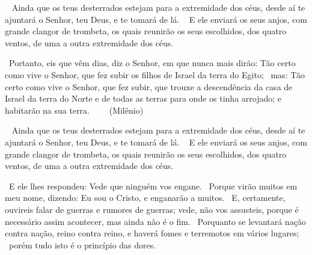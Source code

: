 \documentclass[12pt,aspectratio=169]{beamer}
\newcommand{\ver}[1]{%
    \raisebox{0.50ex}{%
        \scalebox{1.1}{%
            \pmb{\textbf{\textcolor{BSpbg}{#1}}}%
        }%
    }%
}
\newcommand{\QUOTE}[1]{%
    \par\noindent\hspace*{0.1\linewidth}%
    \begin{minipage}{0.8\linewidth}%
        \linespread{1.35}\large{#1}%
    \end{minipage}%
}
\newcommand{\WIDEQUOTE}[1]{%
    \par\noindent\hspace*{0.02\linewidth}%
    \begin{minipage}{0.92\linewidth}%
        \linespread{1.25}\large{#1}%
    \end{minipage}%
}
\newcommand{\RED}[1]{{\textcolor{TXred}{#1}}}
\newcommand{\ORA}[1]{{\textcolor{TXora}{#1}}}
\newcommand{\YEL}[1]{{\textcolor{TXyel}{#1}}}
\newcommand{\GRE}[1]{{\textcolor{TXgre}{#1}}}
\newcommand{\CYA}[1]{{\textcolor{TXcya}{#1}}}
\newcommand{\BLU}[1]{{\textcolor{TXblu}{#1}}}
\newcommand{\MAG}[1]{{\textcolor{TXmag}{#1}}}
\newcommand{\BRI}[1]{{\textcolor{BSpbg}{#1}}}   %
\begin{document}
    \begin{frame}
        \QUOTE{%
            \ver{(ARA) Dt~30.4}~%
            Ainda  que  os   teus   \BLU{des}\BRI{ter}\BLU{ra}\BRI{dos}   estejam   para   a
            \GRE{extremidade dos céus}, desde aí te \ORA{ajuntará} o Senhor, teu Deus, e  te
            tomará de lá.
            \ver{(ARA) Mt~24.31}~%
            E ele enviará os seus \YEL{anjos}, com grande  clangor  de  trombeta,  os  quais
            \ORA{reunirão} os seus \BLU{es}\BRI{co}\BLU{lhi}\BRI{dos},  dos  quatro  ventos,
            de uma a outra \GRE{extremidade dos céus}.
        }
    \end{frame}

    \begin{frame}
        \QUOTE{%
            \ver{(ARA) Jr~23.7}~Portanto, eis que vêm dias, diz o Senhor, em que nunca  mais
            dirão: Tão certo como vive o Senhor, que fez \YEL{subir os filhos de  Israel  da
            terra do Egito}; \ver{8}~mas: Tão certo como vive o Senhor, que fez  subir,  que
            \MAG{trouxe a descendência da casa de Israel da terra do Norte  e  de  todas  as
            terras  para  onde  os  tinha  arrojado};  \GRE{e  habitarão  na   sua   terra}.
            $\qquad$(\GRE{Milênio})
        }
    \end{frame}

    \begin{frame}
        \QUOTE{%
            \ver{(ARA) Dt~30.4}~%
            Ainda  que  os   teus   \BLU{des}\BRI{ter}\BLU{ra}\BRI{dos}   estejam   para   a
            \GRE{extremidade dos céus}, desde aí te \ORA{ajuntará} o Senhor, teu Deus, e  te
            tomará de lá.
            \ver{(ARA) Mt~24.31}~%
            E ele enviará os seus \YEL{anjos}, com grande  clangor  de  trombeta,  os  quais
            \ORA{reunirão} os seus \BLU{es}\BRI{co}\BLU{lhi}\BRI{dos},  dos  quatro  ventos,
            de uma a outra \GRE{extremidade dos céus}.
        }
    \end{frame}

    \begin{frame}
        \WIDEQUOTE{%
            \ver{(ARA) Mt~24.4}~E ele lhes respondeu: Vede  que  ninguém  vos  \RED{engane}.
            \ver{5}~Porque  virão  muitos  em  meu  nome,  dizendo:  Eu  sou  o  Cristo,   e
            \RED{enganarão} a muitos. \ver{6}~E, certamente, ouvireis falar de \ORA{guerras}
            e \ORA{rumores de guerras}; vede, não vos assusteis, porque é  necessário  assim
            acontecer, mas ainda não é o \BLU{fim}.  \ver{7}~Porquanto  se  levantará  nação
            \ORA{contra}  nação,  reino  \ORA{contra}  reino,   e   haverá   \YEL{fomes}   e
            \GRE{terremotos} em \YEL{vários} \GRE{lugares};  \ver{8}~porém  tudo  isto  é  o
            \CYA{princípio das dores}.
        }
    \end{frame}
\end{document}
